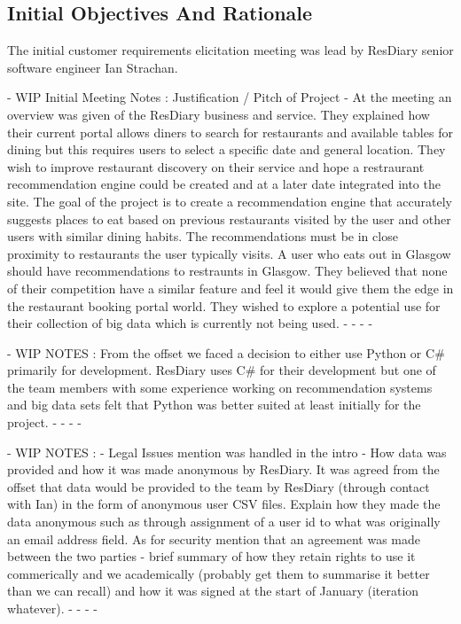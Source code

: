 \documentclass{l3proj}
\begin{document}
\subsection{Initial Objectives And Rationale}
\label{initobjectives}

The initial customer requirements elicitation meeting was lead by ResDiary senior software engineer Ian Strachan. 

- WIP Initial Meeting Notes : Justification / Pitch of Project -
At the meeting an overview was given of the ResDiary business and service. 
They explained how their current portal allows diners to search for restaurants and available tables for dining but this requires users to select a specific date and general location. 
They wish to improve restaurant discovery on their service and hope a restraurant recommendation engine could be created and at a later date integrated into the site.
The goal of the project is to create a recommendation engine that accurately suggests places to eat based on previous restaurants visited by the user and other users with similar dining habits.
The recommendations must be in close proximity to restaurants the user typically visits. A user who eats out in Glasgow should have recommendations to restraunts in Glasgow.
They believed that none of their competition have a similar feature and feel it would give them the edge in the restaurant booking portal world.
They wished to explore a potential use for their collection of big data which is currently not being used. 
- - - -  

- WIP NOTES : 
From the offset we faced a decision to either use Python or C# primarily for development. ResDiary uses C# for their development but one of the team members with some experience working on recommendation systems and big data sets felt that Python was better suited at least initially for the project. 
- - - - 

- WIP NOTES : 
- Legal Issues mention was handled in the intro
- How data was provided and how it was made anonymous by ResDiary.
It was agreed from the offset that data would be provided to the team by ResDiary (through contact with Ian) in the form of anonymous user CSV files. Explain how they made the data anonymous such as through assignment of a user id to what was originally an email address field.
As for security mention that an agreement was made between the two parties - brief summary of how they retain rights to use it commerically and we academically (probably get them to summarise it better than we can recall) and how it was signed at the start of January (iteration whatever).
- - - - 
\end{document}
